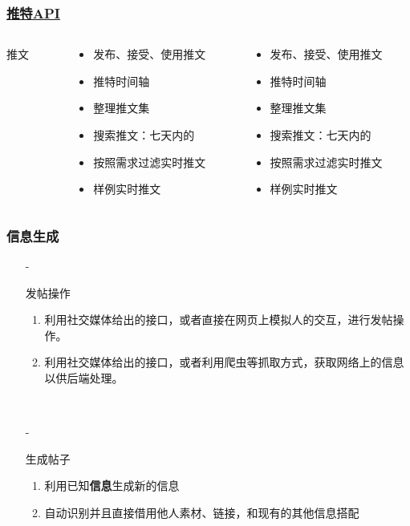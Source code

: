 \documentclass[../Postbot.tex]{subfiles}
\begin{document}
	\begin{frame}
		\frametitle{\href{https://developer.twitter.com/en/products/twitter-api}{推特API}}
		\begin{columns}
			\begin{column}{.2\textwidth}
				\centering
				{\normalsize 推文}
				\hspace*{\fill}
				\hspace*{\fill}
			\end{column}

			\begin{column}{.8\textwidth}
				\begin{itemize}
					\item 发布、接受、使用推文
					\item 推特时间轴
					\item 整理推文集
					\item 搜索推文：七天内的
					\item 按照需求过滤实时推文
					\item 样例实时推文
				\end{itemize}
			\end{column}

			\begin{column}{.8\textwidth}
				\begin{itemize}
					\item 发布、接受、使用推文
					\item 推特时间轴
					\item 整理推文集
					\item 搜索推文：七天内的
					\item 按照需求过滤实时推文
					\item 样例实时推文
				\end{itemize}
			\end{column}
			
		\end{columns}


	\end{frame}

	\begin{frame}
		\frametitle{信息生成}
		\begin{itemize}
			\item[-]{
				发帖操作
				\begin{enumerate}
					\item 利用社交媒体给出的接口，或者直接在网页上模拟人的交互，进行发帖操作。
					\item 利用社交媒体给出的接口，或者利用爬虫等抓取方式，获取网络上的信息以供后端处理。
				\end{enumerate}
				\hspace*{\fill}\\
				}
			\item[-]{
				生成帖子
				\begin{enumerate}
					\item 利用已知\textbf{信息}生成新的信息
					\item 自动识别并且直接借用他人素材、链接，和现有的其他信息搭配
				\end{enumerate}
				} 
		\end{itemize}
	\end{frame}
\end{document}
